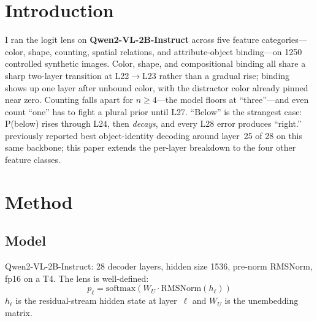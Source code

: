 \documentclass{article}
\begin{document}

\section{Introduction}
\label{sec:intro}

I ran the logit lens on \textbf{Qwen2-VL-2B-Instruct} across five feature categories---color, shape, counting, spatial relations, and attribute-object binding---on 1250 controlled synthetic images.
Color, shape, and compositional binding all share a sharp two-layer transition at L22$\to$L23 rather than a gradual rise; binding shows up one layer after unbound color, with the distractor color already pinned near zero.
Counting falls apart for $n\ge4$---the model floors at ``three''---and even count ``one'' has to fight a plural prior until L27.
``Below'' is the strangest case: P(below) rises through L24, then \emph{decays}, and every L28 error produces ``right.''
\citet{neo2025interpreting} previously reported best object-identity decoding around layer~25 of 28 on this same backbone; this paper extends the per-layer breakdown to the four other feature classes.

\section{Method}
\label{sec:method}

\subsection{Model}

Qwen2-VL-2B-Instruct: 28 decoder layers, hidden size 1536, pre-norm RMSNorm, fp16 on a T4.
The lens is well-defined:
\begin{equation}
    p_\ell = \text{softmax}\!\left(W_U \cdot \text{RMSNorm}(h_\ell)\right)
    \label{eq:logitlens}
\end{equation}
$h_\ell$ is the residual-stream hidden state at layer~$\ell$ and $W_U$ is the unembedding matrix.
\end{document}
